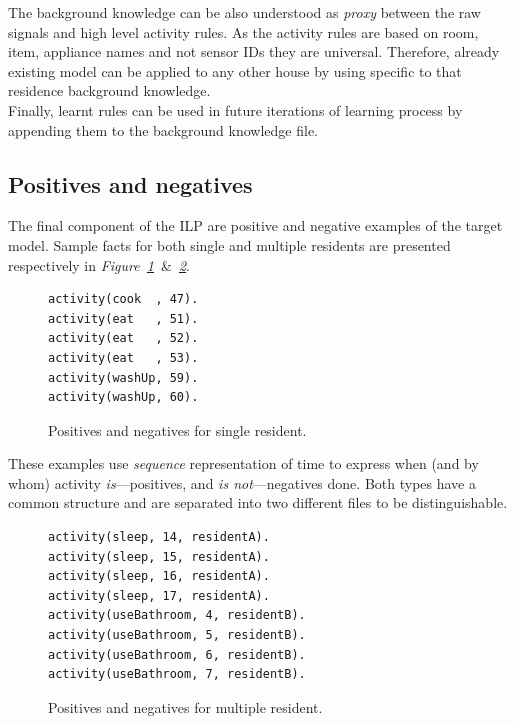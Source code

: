 \documentclass[10pt, a4paper, pdflatex, leqno, twoside, openright]{report}
\begin{document}
The background knowledge can be also understood as \emph{proxy} between the raw signals and high level activity rules. As the activity rules are based on room, item, appliance names and not sensor IDs they are universal. Therefore, already existing model can be applied to any other house by using specific to that residence background knowledge.\\
Finally, learnt rules can be used in future iterations of learning process by appending them to the background knowledge file.


    \subsection{Positives and negatives\label{sec:data:posneg}}
The final component of the ILP are positive and negative examples of the target model. Sample facts for both single and multiple residents are presented respectively in \emph{Figure~\ref{lst:singleposneg}}~\&~\emph{\ref{lst:multiposneg}}.\\

\begin{figure}[htb] %
  \begin{verbatim}
activity(cook  , 47).
activity(eat   , 51).
activity(eat   , 52).
activity(eat   , 53).
activity(washUp, 59).
activity(washUp, 60).
  \end{verbatim}
  \caption{Positives and negatives for single resident.\label{lst:singleposneg}}
\end{figure}

These examples use \emph{sequence} representation of time to express when (and by whom) activity \emph{is}---positives, and \emph{is not}---negatives done. Both types have a common structure and are separated into two different files to be distinguishable.\\

\begin{figure}[htb] %
  \begin{verbatim}
activity(sleep, 14, residentA).
activity(sleep, 15, residentA).
activity(sleep, 16, residentA).
activity(sleep, 17, residentA).
activity(useBathroom, 4, residentB).
activity(useBathroom, 5, residentB).
activity(useBathroom, 6, residentB).
activity(useBathroom, 7, residentB).
  \end{verbatim}
  \caption{Positives and negatives for multiple resident.\label{lst:multiposneg}}
\end{figure}
\end{document}
